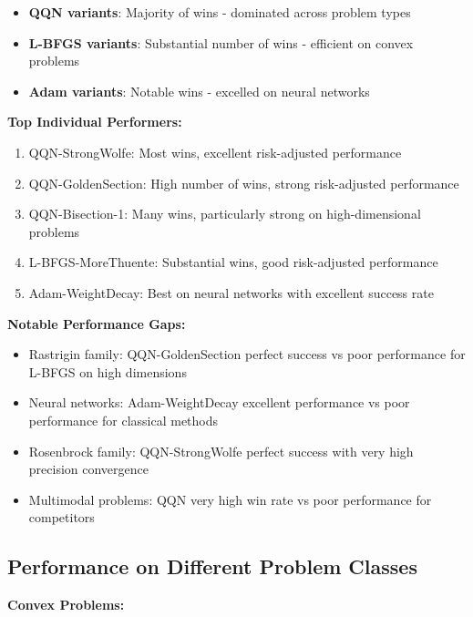 \begin{itemize}
\tightlist
\item
  \textbf{QQN variants}: Majority of wins - dominated across problem types
\item
  \textbf{L-BFGS variants}: Substantial number of wins - efficient on convex problems
\item
  \textbf{Adam variants}: Notable wins - excelled on neural networks
\end{itemize}

\textbf{Top Individual Performers:}

\begin{enumerate}
\def\labelenumi{\arabic{enumi}.}
\tightlist
\item
  QQN-StrongWolfe: Most wins, excellent risk-adjusted performance
\item
  QQN-GoldenSection: High number of wins, strong risk-adjusted performance
\item
  QQN-Bisection-1: Many wins, particularly strong on high-dimensional problems
\item
  L-BFGS-MoreThuente: Substantial wins, good risk-adjusted performance
\item
  Adam-WeightDecay: Best on neural networks with excellent success rate
\end{enumerate}

\textbf{Notable Performance Gaps:}

\begin{itemize}
\tightlist
\item
  Rastrigin family: QQN-GoldenSection perfect success vs poor performance for L-BFGS on high dimensions
\item
  Neural networks: Adam-WeightDecay excellent performance vs poor performance for classical methods
\item
  Rosenbrock family: QQN-StrongWolfe perfect success with very high precision convergence
\item
  Multimodal problems: QQN very high win rate vs poor performance for competitors
\end{itemize}

\hypertarget{performance-on-different-problem-classes}{%
\subsection{Performance on Different Problem Classes}\label{performance-on-different-problem-classes}}

\textbf{Convex Problems:}

